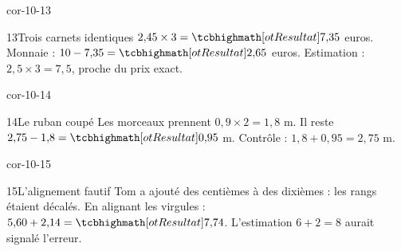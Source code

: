 \begin{blocLivre}{cor-10-13}\begin{corrige}{13}{Trois carnets identiques}
$2{,}45\times3=\res{7{,}35}$ euros. Monnaie : $10-7{,}35=\res{2{,}65}$ euros. Estimation : $2{,}5\times3=7{,}5$, proche du prix exact.
\end{corrige}\end{blocLivre}
\begin{blocLivre}{cor-10-14}\begin{corrige}{14}{Le ruban coupé}
Les morceaux prennent $0{,}9\times2=1{,}8$ m. Il reste $2{,}75-1{,}8=\res{0{,}95}$ m. Contrôle : $1{,}8+0{,}95=2{,}75$ m.
\end{corrige}\end{blocLivre}
\begin{blocLivre}{cor-10-15}\begin{corrige}{15}{L’alignement fautif}
Tom a ajouté des centièmes à des dixièmes : les rangs étaient décalés. En alignant les virgules : $5{,}60+2{,}14=\res{7{,}74}$. L’estimation $6+2=8$ aurait signalé l’erreur.
\end{corrige}\end{blocLivre}
